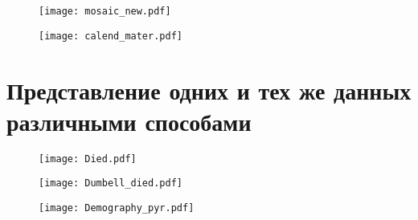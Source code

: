 \documentclass[xcolor=dvipsnames, 12pt]{beamer}
\begin{document}
\begin{frame}

\begin{figure}[h!]
\hspace*{-1cm}
 \centering
 \texttt{[image: mosaic\_new.pdf]}

\end{figure}

\end{frame}

\begin{frame}

\begin{figure}[h!]
\hspace*{-1cm}
 \centering
 \texttt{[image: calend\_mater.pdf]}

\end{figure}

\end{frame}



\section{Представление одних и тех же данных различными способами}

\begin{frame}

\begin{figure}[h!]
\hspace*{-1cm}
 \centering
 \texttt{[image: Died.pdf]}

\end{figure}

\end{frame}

\begin{frame}

\begin{figure}[h!]
\hspace*{-1cm}
 \centering
 \texttt{[image: Dumbell\_died.pdf]}

\end{figure}

\end{frame}

\begin{frame}

\begin{figure}[h!]
\hspace*{-1cm}
 \centering
 \texttt{[image: Demography\_pyr.pdf]}

\end{figure}

\end{frame}
\end{document}
